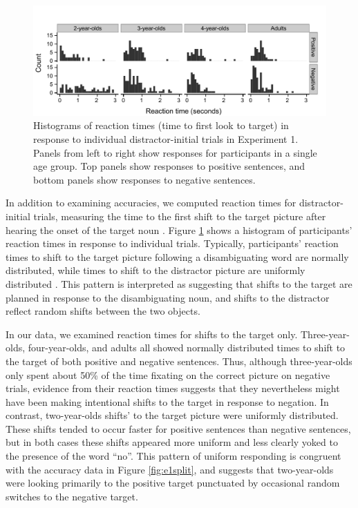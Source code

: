 \documentclass[man]{apa2}
\begin{document}
\begin{figure}
\begin{center} 
\includegraphics[width=6in]{RTs_nothing.pdf}
\caption{\label{fig:e1rt} Histograms of reaction times (time to first look to target) in response to individual distractor-initial trials in Experiment 1.  Panels from left to right show responses for participants in a single age group.  Top panels show responses to positive sentences, and bottom panels show responses to negative sentences.}
\end{center} 
\end{figure}

In addition to examining accuracies, we computed reaction times for distractor-initial trials, measuring the time to the first shift to the target picture after hearing the onset of the target noun \cite{fernald2008}.  Figure \ref{fig:e1rt} shows a histogram of participants' reaction times in response to individual trials.  Typically, participants' reaction times to shift to the target picture following a disambiguating word are normally distributed,  while times to shift to the distractor picture are uniformly distributed \cite{fernald2008}.  This pattern is interpreted as suggesting that shifts to the target are planned in response to the disambiguating noun, and shifts to the distractor reflect random shifts between the two objects.  

In our data, we examined reaction times for shifts to the target only. Three-year-olds, four-year-olds, and adults all showed normally distributed times to shift to the target of both positive and negative sentences. Thus, although three-year-olds only spent about 50\% of the time fixating on the correct picture on negative trials, evidence from their reaction times suggests that they nevertheless might have been making intentional shifts to the target in response to negation.  In contrast, two-year-olds shifts' to the target picture were uniformly distributed.  These shifts tended to occur faster for positive sentences than negative sentences, but in both cases these shifts appeared more uniform and less clearly yoked to the presence of the word ``no''.  This pattern of uniform responding is congruent with the accuracy data in Figure \ref{fig:e1split}, and suggests that two-year-olds were looking primarily to the positive target punctuated by occasional random switches to the negative target.  
\end{document}
